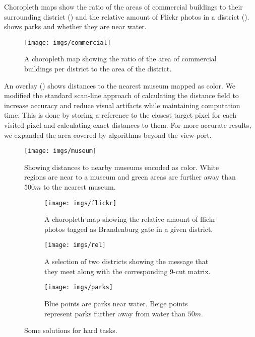 Choropleth maps show the ratio of the areas of commercial buildings to their surrounding
district () and the relative amount of
Flickr photos in a district ().
 shows parks and whether they are near water.
\begin{figure}
        \centering
		\texttt{[image: imgs/commercial]}
        \caption{A choropleth map showing the ratio of the area of commercial buildings
        per district to the area of the district.}
		\label{fig:commercial}
\end{figure}
An overlay () shows distances to the nearest museum mapped as color.
We modified the standard scan-line approach of calculating the distance field to
increase accuracy and reduce visual artifacts while maintaining computation time.
This is done by storing a reference to the closest target pixel for each visited
pixel and calculating exact distances to them. For more accurate
results, we expanded the area covered by algorithms beyond the view-port.
\begin{figure}[b]
        \centering
		\texttt{[image: imgs/museum]}
        \caption{Showing distances to nearby museums encoded as color. White regions
        are near to a museum and green areas are further away than $500m$ to the
        nearest museum.}
		\label{fig:museum}
\end{figure}
\begin{figure*}[t]
		\centering
		\begin{subfigure}[b]{0.22\textwidth}
                \centering
                \texttt{[image: imgs/flickr]}
                \caption{A choropleth map showing the relative amount of flickr photos tagged
                as Brandenburg gate in a given district.}
                \label{fig:flickr}
        \end{subfigure}
        \hspace*{0.02\textwidth}
        \begin{subfigure}[b]{0.22\textwidth}
				\centering
				\texttt{[image: imgs/rel]}
				\caption{A selection of two districts showing the message that
				they meet along with the corresponding 9-cut matrix.}
				\label{fig:rel}
		\end{subfigure}
		\hspace*{0.02\textwidth}
        \begin{subfigure}[b]{0.22\textwidth}
                \centering
                \texttt{[image: imgs/parks]}
                \caption{Blue points are parks near water. Beige points represent parks further
                away from water than $50m$.}
                \label{fig:parks}
        \end{subfigure}
        \caption{Some solutions for hard tasks.}
\end{figure*}
